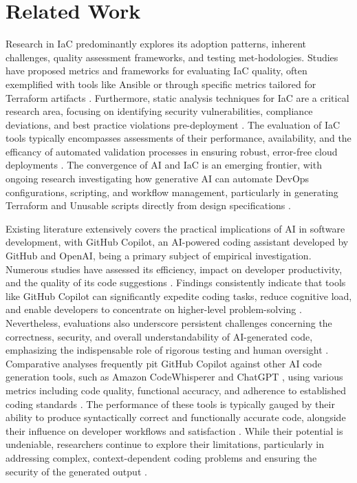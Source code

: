\section{Related Work}
\label{sec:related-work}

Research in IaC predominantly explores its adoption patterns, inherent challenges, quality assessment frameworks, and testing met-hodologies. Studies have proposed metrics and frameworks for evaluating IaC quality, often exemplified with tools like Ansible or through specific metrics tailored for Terraform artifacts \cite{konala2025frameworkmeasuringqualityinfrastructureascode, DALLAPALMA2020110726}. Furthermore, static analysis techniques for IaC are a critical research area, focusing on identifying security vulnerabilities, compliance deviations, and best practice violations pre-deployment \cite{9779848}. The evaluation of IaC tools typically encompasses assessments of their performance, availability, and the efficancy of automated validation processes in ensuring robust, error-free cloud deployments \cite{article, 10516612}. The convergence of AI and IaC is an emerging frontier, with ongoing research investigating how generative AI can automate DevOps configurations, scripting, and workflow management, particularly in generating Terraform and Unusable scripts directly from design specifications \cite{article_kate, kumar_ai-powered_2025}.


Existing literature extensively covers the practical implications of AI in software development, with GitHub Copilot, an AI-powered coding assistant developed by GitHub and OpenAI, being a primary subject of empirical investigation. Numerous studies have assessed its efficiency, impact on developer productivity, and the quality of its code suggestions \cite{pandey2024transformingsoftwaredevelopmentevaluating, 9796235}. Findings consistently indicate that tools like GitHub Copilot can significantly expedite coding tasks, reduce cognitive load, and enable developers to concentrate on higher-level problem-solving \cite{kalliamvakou_research_2022}. Nevertheless, evaluations also underscore persistent challenges concerning the correctness, security, and overall understandability of AI-generated code, emphasizing the indispensable role of rigorous testing and human oversight \cite{10.1145/3715108, oertel_dont_2025}. Comparative analyses frequently pit GitHub Copilot against other AI code generation tools, such as Amazon CodeWhisperer and ChatGPT , using various metrics including code quality, functional accuracy, and adherence to established coding standards \cite{yetistiren2023evaluating} . The performance of these tools is typically gauged by their ability to produce syntactically correct and functionally accurate code, alongside their influence on developer workflows and satisfaction \cite{oertel_dont_2025}. While their potential is undeniable, researchers continue to explore their limitations, particularly in addressing complex, context-dependent coding problems and ensuring the security of the generated output \cite{sun_terraform_2025}.

